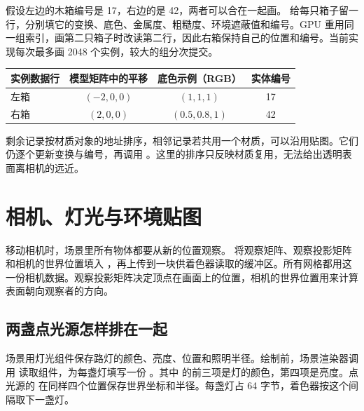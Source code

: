 假设左边的木箱编号是 17，右边的是 42，两者可以合在一起画。 给每只箱子留一行，分别填它的变换、底色、金属度、粗糙度、环境遮蔽值和编号。GPU 重用同一组索引，画第二只箱子时改读第二行，因此右箱保持自己的位置和编号。当前实现每次最多画 2048 个实例，较大的组分次提交。

\begin{center}
\small\begin{tabular}{@{}lccc@{}}
\toprule
实例数据行 & 模型矩阵中的平移 & 底色示例（RGB） & 实体编号 \\
\midrule
左箱 & $(-2,0,0)$ & $(1,1,1)$ & 17 \\
右箱 & $(2,0,0)$ & $(0.5,0.8,1)$ & 42 \\
\bottomrule
\end{tabular}
\end{center}

剩余记录按材质对象的地址排序，相邻记录若共用一个材质，可以沿用贴图。它们仍逐个更新变换与编号，再调用 。这里的排序只反映材质复用，无法给出透明表面离相机的远近。

\clearpage
\section{相机、灯光与环境贴图}
移动相机时，场景里所有物体都要从新的位置观察。 将观察矩阵、观察投影矩阵和相机的世界位置填入 ，再上传到一块供着色器读取的缓冲区。所有网格都用这一份相机数据。观察投影矩阵决定顶点在画面上的位置，相机的世界位置用来计算表面朝向观察者的方向。

\subsection{两盏点光源怎样排在一起}
场景用灯光组件保存路灯的颜色、亮度、位置和照明半径。绘制前，场景渲染器调用  读取组件，为每盏灯填写一份 。其中  的前三项是灯的颜色，第四项是亮度。点光源的  在同样四个位置保存世界坐标和半径。每盏灯占 64 字节，着色器按这个间隔取下一盏灯。

